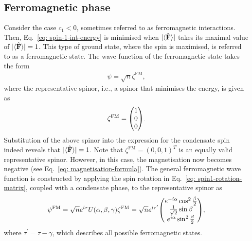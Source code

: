 \subsection{Ferromagnetic phase}
Consider the case \(c_1 < 0 \), sometimes referred to as ferromagnetic
interactions.
Then, Eq.~\eqref{eq: spin-1-int-energy} is minimised when \(|\langle \hat{\vb{F}} \rangle | \) takes
its maximal value of \(|\langle \hat{\vb{F}} \rangle |=1\).
This type of ground state, where the spin is maximised, is referred to as a
ferromagnetic state.
The wave function of the ferromagnetic state takes the form
\begin{align}
    \psi=\sqrt{n}\zeta^\text{FM},
\end{align}
where the representative spinor, i.e., a spinor that minimises the energy, is
given as~\cite{Kawaguchi2012}
\begin{align}\label{eq: spin-1-FM-rep-spinor}
    \zeta^\text{FM} = \mqty(1 \\ 0 \\ 0).
\end{align}
Substitution of the above spinor into the expression for the condensate spin
indeed reveals that \(|\langle \hat{\vb{F}} \rangle |=1\).
Note that \(\zeta^\text{FM}={(0, 0, 1)}^T\) is an equally valid representative
spinor.
However, in this case, the magnetisation now becomes negative (see
Eq.~\eqref{eq: magnetisation-formula}).
The general ferromagnetic wave function is constructed by applying the
spin rotation in Eq.~\eqref{eq: spin1-rotation-matrix}, coupled with a
condensate phase, to the representative spinor as
\begin{align}\label{eq: FM-representative-spinor}
    \psi^\mathrm{FM} =
    \sqrt{n}e^{i\tau}U(\alpha, \beta, \gamma)\zeta^\mathrm{FM} =
    \sqrt{n}e^{i\tau^\prime}\mqty(
    e^{-i\alpha}\cos^2\frac{\beta}{2} \\
    \frac{1}{\sqrt{2}}\sin\beta \\
    e^{i\alpha}\sin^2\frac{\beta}{2}
    ),
\end{align}
where \(\tau^\prime = \tau-\gamma \), which describes all possible ferromagnetic
states.


